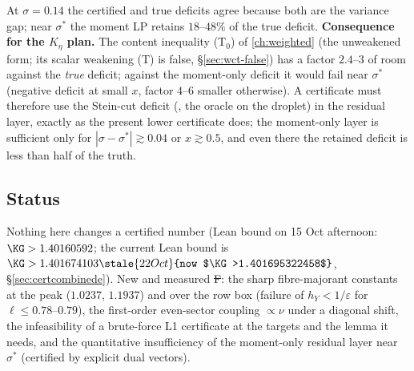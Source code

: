 At $\sigma=0.14$ the certified and true deficits agree because both are the variance gap; near $\sigma^*$ the moment LP retains $18$--$48\%$ of the true deficit. \textbf{Consequence for the
$K_\eta$ plan.} The content inequality (T$_0$) of \autoref{ch:weighted} (the unweakened form; its scalar weakening (T) is false, \S\ref{sec:wct-false}) has a factor $2.4$--$3$ of room against the \emph{true} deficit; against the moment-only deficit it would fail near
$\sigma^*$ (negative deficit at small $x$, factor $4$--$6$ smaller otherwise). A certificate must therefore use the Stein-cut deficit (, the  oracle on the droplet) in the
residual layer, exactly as the present lower certificate does; the moment-only layer is sufficient only for $|\sigma-\sigma^*|\gtrsim0.04$ or $x\gtrsim0.5$, and even there the retained deficit
is less than half of the truth.

\subsection{Status}
Nothing here changes a certified number (Lean bound on 15 Oct afternoon: $\KG>1.40160592$; the current Lean bound is $\KG>1.401674103\stale{22 Oct}{now $\KG>1.401695322458$}$, \S\ref{sec:certcombinede}). New and measured \st{F}: the sharp fibre-majorant constants at the peak ($1.0237$, $1.1937$) and over the row box (failure of
$h_Y<1/\varepsilon$ for $\ell\le0.78$--$0.79$), the first-order even-sector coupling $\propto\nu$ under a diagonal shift, the infeasibility of a brute-force L1 certificate at the targets and the
lemma it needs, and the quantitative insufficiency of the moment-only residual layer near $\sigma^*$ (certified by explicit dual vectors).

